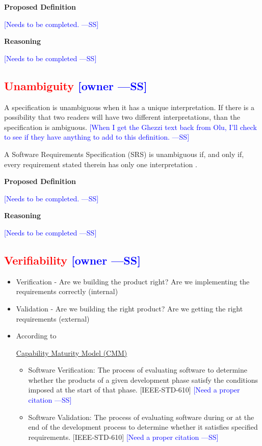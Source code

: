 \documentclass[letterpaper,cleveref]{lipics-v2019}
\newcommand{\authornote}[3]{\textcolor{#1}{[#3 ---#2]}}
\newcommand{\authornote}[3]{}
\newcommand{\wss}[1]{\authornote{blue}{SS}{#1}} %
\newcommand{\notdone}[1]{\textcolor{red}{#1}}
\theoremstyle{definition}
\begin{document}
\noindent \textbf{Proposed Definition} 

\wss{Needs to be completed.}

\noindent \textbf{Reasoning}

\wss{Needs to be completed}

\subsection{\notdone{Unambiguity} \wss{owner}}

A specification is unambiguous when it has a unique interpretation.  If there is
a possibility that two readers will have two different interpretations, than the
specification is ambiguous.  \wss{When I get the Ghezzi text back from Olu, I'll
  check to see if they have anything to add to this definition.}

A Software Requirements Specification (SRS) is unambiguous if, and only if,
every requirement stated therein has only one interpretation \citep{IEEE1998}.

\noindent \textbf{Proposed Definition} 

\wss{Needs to be completed.}

\noindent \textbf{Reasoning}

\wss{Needs to be completed}

\subsection{\notdone{Verifiability} \wss{owner}}

\begin{itemize}
	
\item Verification - Are we building the product right?  Are we implementing the
  requirements correctly (internal)
\item Validation - Are we building the right product? Are we getting the right
  requirements (external)
\item According to
	
  \href{https://en.wikipedia.org/wiki/Software_verification_and_validation}{Capability
    Maturity Model (CMM)}
  \begin{itemize}
  \item Software Verification: The process of evaluating software to determine
    whether the products of a given development phase satisfy the conditions
    imposed at the start of that phase. [IEEE-STD-610] \wss{Need a proper
      citation}
  \item Software Validation: The process of evaluating software during or at the
    end of the development process to determine whether it satisfies specified
    requirements. [IEEE-STD-610] \wss{Need a proper citation}
  \end{itemize}
\end{itemize}
\end{document}
